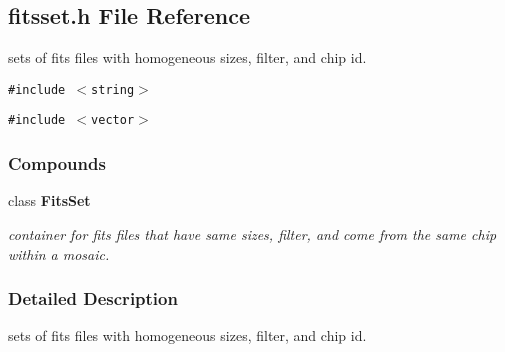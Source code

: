 \subsection{fitsset.h File Reference}
\label{fitsset_h}
sets of fits files with homogeneous sizes, filter, and chip id. 


{\tt \#include $<$string$>$}\par
{\tt \#include $<$vector$>$}\par
\subsubsection*{Compounds}
\begin{CompactItemize}
\item 
class {\bf Fits\-Set}
\begin{CompactList}\small\item\em container for fits files that have same sizes, filter, and come from the same chip within a mosaic.\item\end{CompactList}\end{CompactItemize}


\subsubsection{Detailed Description}
sets of fits files with homogeneous sizes, filter, and chip id.



